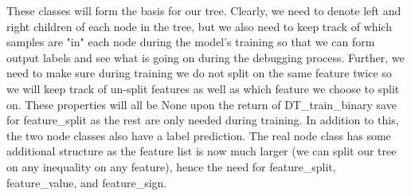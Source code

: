 \documentclass{article}
\begin{document}
    These classes will form the basis for our tree. Clearly, we need to denote
left and right children of each node in the tree, but we also need to
keep track of which samples are "in" each node during the model's training
so that we can form output labels and see what is going on during the debugging
process. Further, we need to make sure during training we do not split on
the same feature twice so we will keep track of un-split features as well
as which feature we choose to split on. These properties will all be None
upon the return of DT_train_binary save for feature_split as the rest are
only needed during training. In addition to this, the two node classes
also have a label prediction. The real node class has some additional structure
as the feature list is now much larger (we can split our tree on any inequality
on any feature), hence the need for feature_split, feature_value, and feature_sign.
\end{document}
